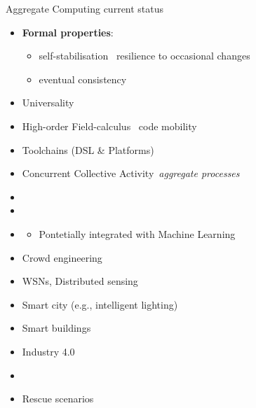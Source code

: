 \documentclass[8pt, aspectratio=169, handout]{beamer}
\begin{document}
\begin{frame}[allowframebreaks]{Aggregate Computing current status}
  \begin{card}
    \begin{itemize}
      \item \textbf{Formal properties}:
      \begin{itemize}
        \item self-stabilisation \faArrowRight\, resilience to occasional changes
        \item eventual consistency
      \end{itemize}
      \item Universality
      \item High-order Field-calculus \faArrowRight \, code mobility
      \item Toolchains (DSL \& Platforms)
      \item Concurrent Collective Activity \faArrowRight \,\emph{aggregate processes}
    \end{itemize}
  \end{card}
  \begin{card}
    \begin{itemize}
      \item {}
      \item {}
      \item {}
      \begin{itemize}
        \item Pontetially integrated with Machine Learning
      \end{itemize}
    \end{itemize}
  \end{card}
  \begin{card}
    \begin{itemize}
    \item Crowd engineering
    \item WSNs, Distributed sensing
    \item Smart city (e.g., intelligent lighting)
    \item Smart buildings
    \item Industry 4.0
    \item {}
    \item Rescue scenarios
    \end{itemize}
  \end{card}
\end{frame}
\end{document}
